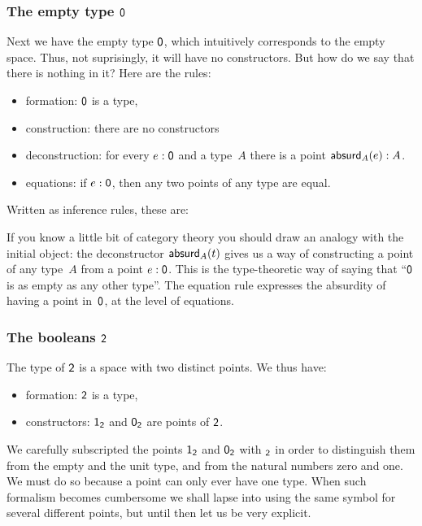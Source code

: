 \documentclass{amsart}
\begin{document}
\subsubsection{The empty type $\mathsf{0}$}

Next we have the empty type $\mathsf{0}$, which intuitively corresponds to the empty
space. Thus, not suprisingly, it will have no constructors. But how do we say
that there is nothing in it? Here are the rules:
%
\begin{itemize}
\item formation: $\mathsf{0}$ is a type,
\item construction: there are no constructors
\item deconstruction: for every $e : \mathsf{0}$ and a type~$A$ there is a point $\mathsf{absurd}_{A}(e) : A$.
\item equations: if $e : \mathsf{0}$, then any two points of any type are equal.
\end{itemize}
%
Written as inference rules, these are:
%
%
If you know a little bit of category theory you should draw an analogy with the
initial object: the deconstructor $\mathsf{absurd}_{A}(t)$ gives us a way of constructing
a point of any type~$A$ from a point $e : \mathsf{0}$. This is the type-theoretic
way of saying that ``$\mathsf{0}$ is as empty as any other type''. The equation rule
expresses the absurdity of having a point in~$\mathsf{0}$, at the level of
equations.

\subsubsection{The booleans $\mathsf{2}$}

The type of $\mathsf{2}$ is a space with two distinct points. We thus have:
%
\begin{itemize}
\item formation: $\mathsf{2}$ is a type,
\item constructors: $\mathsf{1}_{\mathsf{2}}$ and $\mathsf{0}_{\mathsf{2}}$ are points of $\mathsf{2}$.
\end{itemize}
%
We carefully subscripted the points $\mathsf{1}_{\mathsf{2}}$ and $\mathsf{0}_{\mathsf{2}}$ with ${}_{\mathsf{2}}$ in order
to distinguish them from the empty and the unit type, and from the natural
numbers zero and one. We must do so because a point can only ever have one type.
When such formalism becomes cumbersome we shall lapse into using the same symbol
for several different points, but until then let us be very explicit.
\end{document}
